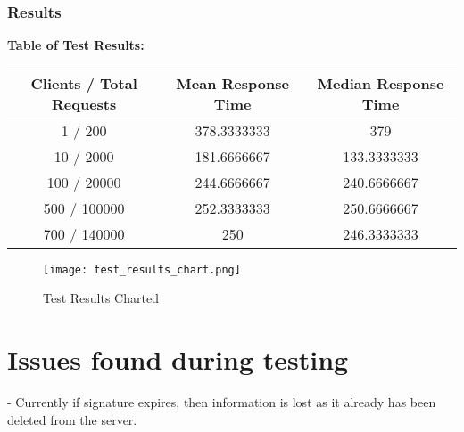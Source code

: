 \subsubsection{Results}
\begin{center}
    \textbf{Table of Test Results:} 
\begin{tabular}{ |c|c|c| } 
 \hline
 Clients / Total Requests & Mean Response Time & Median Response Time\\ 
 \hline
 1 / 200 & 378.3333333 & 379 \\ 
 \hline
 10 / 2000 & 181.6666667 & 133.3333333 \\ 
 \hline
 100 / 20000 & 244.6666667 & 240.6666667 \\ 
 \hline
 500 / 100000 & 252.3333333 & 250.6666667 \\ 
 \hline
 700 / 140000 & 250 & 246.3333333 \\ 
 \hline
\end{tabular}
\end{center}
\begin{figure}[h]
\caption{Test Results Charted}
\texttt{[image: test\_results\_chart.png]}
\label{fig:test_results_chart}
\end{figure}

\section{Issues found during testing}
- Currently if signature expires, then information is lost as it already has been deleted from the server.
